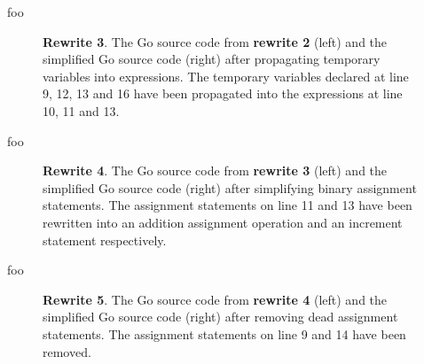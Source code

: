 foo

\begin{figure}[htbp]
	\centering
	\begin{subfigure}[t]{0.45\textwidth}
		
	\end{subfigure}
	\qquad
	\begin{subfigure}[t]{0.45\textwidth}
		
	\end{subfigure}
	\caption{\textbf{Rewrite 3}. The Go source code from \textbf{rewrite 2} (left) and the simplified Go source code (right) after propagating temporary variables into expressions. The temporary variables declared at line 9, 12, 13 and 16 have been propagated into the expressions at line 10, 11 and 13.}
	\label{fig:rewrite_3}
\end{figure}

foo

\begin{figure}[htbp]
	\centering
	\begin{subfigure}[t]{0.45\textwidth}
		
	\end{subfigure}
	\qquad
	\begin{subfigure}[t]{0.45\textwidth}
		
	\end{subfigure}
	\caption{\textbf{Rewrite 4}. The Go source code from \textbf{rewrite 3} (left) and the simplified Go source code (right) after simplifying binary assignment statements. The assignment statements on line 11 and 13 have been rewritten into an addition assignment operation and an increment statement respectively.}
	\label{fig:rewrite_4}
\end{figure}

foo

\begin{figure}[htbp]
	\centering
	\begin{subfigure}[t]{0.45\textwidth}
		
	\end{subfigure}
	\qquad
	\begin{subfigure}[t]{0.45\textwidth}
		
	\end{subfigure}
	\caption{\textbf{Rewrite 5}. The Go source code from \textbf{rewrite 4} (left) and the simplified Go source code (right) after removing dead assignment statements. The assignment statements on line 9 and 14 have been removed.}
	\label{fig:rewrite_5}
\end{figure}

